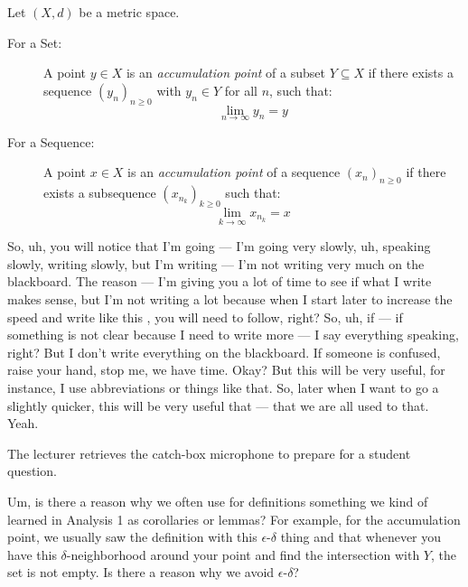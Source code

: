 \begin{math-stroke}
\setcounter{theorem}{22}
\begin{definition}\label{def:accumulation-point}
Let $(X, d)$ be a metric space.
\begin{description}
    \item[For a Set:] A point $y \in X$ is an \emph{accumulation point} of a subset $Y \subseteq X$ if there exists a sequence $(y_n)_{n \ge 0}$ with $y_n \in Y$ for all $n$, such that:
    \[ \lim_{n \to \infty} y_n = y \]
    \item[For a Sequence:] A point $x \in X$ is an \emph{accumulation point} of a sequence $(x_n)_{n \ge 0}$ if there exists a subsequence $(x_{n_k})_{k \ge 0}$ such that:
    \[ \lim_{k \to \infty} x_{n_k} = x \]
\end{description}
\end{definition}
\end{math-stroke}

\begin{spoken-clean}[00:00:36 - 00:01:43]
So, uh, you will notice that I'm going — I'm going very slowly, uh, speaking slowly, writing slowly, but I'm writing — I'm not writing very much on the blackboard. The reason — I'm giving you a lot of time to see if what I write makes sense, but I'm not writing a lot because when I start later to increase the speed and write like this , you will need to follow, right? So, uh, if — if something is not clear because I need to write more — I say everything speaking, right? But I don't write everything on the blackboard. If someone is confused, raise your hand, stop me, we have time. Okay? But this will be very useful, for instance, I use abbreviations or things like that. So, later when I want to go a slightly quicker, this will be very useful that — that we are all used to that. Yeah.
\end{spoken-clean}

\begin{meta-note}
The lecturer retrieves the catch-box microphone to prepare for a student question.
\end{meta-note}

\begin{student-interaction}
Um, is there a reason why we often use for definitions something we kind of learned in Analysis 1 as corollaries or lemmas? For example, for the accumulation point, we usually saw the definition with this $\epsilon$-$\delta$ thing and that whenever you have this $\delta$-neighborhood around your point and find the intersection with $Y$, the set is not empty. Is there a reason why we avoid $\epsilon$-$\delta$?
\end{student-interaction}

